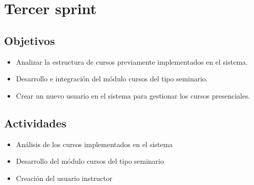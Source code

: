 \section{Tercer sprint} %
\label{sec:tercer_sprint}

\subsection{Objetivos}

\begin{itemize}
	\item Analizar la estructura de cursos previamente implementados en el sistema.
	\item Desarrollo e integración del módulo cursos del tipo seminario.
	\item Crear un nuevo usuario en el sistema para gestionar los cursos presenciales.
\end{itemize}

\subsection{Actividades} %
\label{sub:actividades3}

\begin{itemize}

\item Análisis de los cursos implementados en el sistema
\item Desarrollo del módulo cursos del tipo seminario
\item Creación del usuario instructor

\end{itemize}



